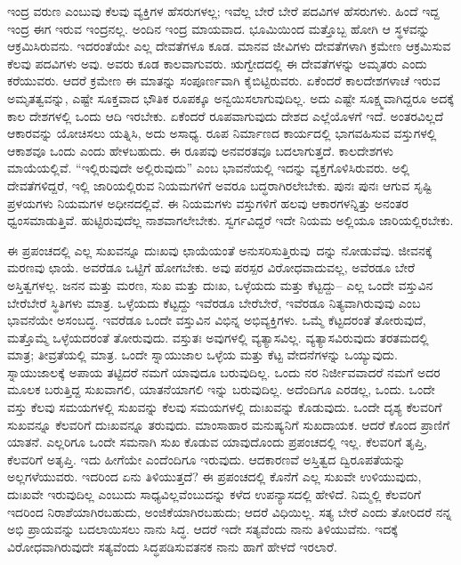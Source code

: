 ಇಂದ್ರ ವರುಣ ಎಂಬುವು ಕೆಲವು ವ್ಯಕ್ತಿಗಳ ಹೆಸರುಗಳಲ್ಲ; ಇವೆಲ್ಲ ಬೇರೆ ಬೇರೆ ಪದವಿಗಳ ಹೆಸರುಗಳು. ಹಿಂದೆ ಇದ್ದ ಇಂದ್ರ ಈಗ ಇರುವ ಇಂದ್ರನಲ್ಲ. ಅಂದಿನ ಇಂದ್ರ ಮಾಯವಾದ. ಭೂಮಿಯಿಂದ ಮತ್ತೊಬ್ಬ ಹೋಗಿ ಆ ಸ್ಥಳವನ್ನು ಆಕ್ರಮಿಸಿರುವನು. ಇದರಂತೆಯೇ ಎಲ್ಲ ದೇವತೆಗಳೂ ಕೂಡ. ಮಾನವ ಜೀವಿಗಳು ದೇವತೆಗಳಾಗಿ ಕ್ರಮೇಣ ಆಕ್ರಮಿಸುವ ಕೆಲವು ಪದವಿಗಳು ಅವು. ಅವರು ಕೂಡ ಕಾಲವಾಗುವರು. ಋಗ್ವೇದದಲ್ಲಿ ಈ ದೇವತೆಗಳನ್ನು ಅಮೃತರು ಎಂದು ಕರೆಯುವರು. ಆದರೆ ಕ್ರಮೇಣ ಈ ಮಾತನ್ನು ಸಂಪೂರ್ಣವಾಗಿ ಕೈಬಿಟ್ಟಿರುವರು. ಏಕೆಂದರೆ ಕಾಲದೇಶಗಳಾಚೆ ಇರುವ ಅಮೃತತ್ವವನ್ನು, ಎಷ್ಟೇ ಸೂಕ್ತವಾದ ಭೌತಿಕ ರೂಪಕ್ಕೂ ಅನ್ವಯಿಸಲಾಗುವುದಿಲ್ಲ. ಅದು ಎಷ್ಟೇ ಸೂಕ್ಷ್ಮವಾಗಿದ್ದರೂ ಅದಕ್ಕೆ ಕಾಲ ದೇಶಗಳಲ್ಲಿ ಒಂದು ಆದಿ ಇರಬೇಕು. ಏಕೆಂದರೆ ರೂಪವಾಗುವುದು ದೇಶದ ಎಲ್ಲೆಯೊಳಗೆ ಇದೆ. ಅಂತರವಿಲ್ಲದೆ ಆಕಾರವನ್ನು ಯೋಚಿಸಲು ಯತ್ನಿಸಿ, ಅದು ಅಸಾಧ್ಯ. ರೂಪ ನಿರ್ಮಾಣದ ಕಾರ್ಯದಲ್ಲಿ ಭಾಗವಹಿಸುವ ವಸ್ತುಗಳಲ್ಲಿ ಆಕಾಶವೂ ಒಂದು ಎಂದು ಹೇಳಬಹುದು. ಈ ರೂಪವು ಅನವರತವೂ ಬದಲಾಗುತ್ತದೆ. ಕಾಲದೇಶಗಳು ಮಾಯೆಯಲ್ಲಿವೆ. “ಇಲ್ಲಿರುವುದೇ ಅಲ್ಲಿರುವುದು” ಎಂಬ ಭಾವನೆಯಲ್ಲಿ ಇದನ್ನು ವ್ಯಕ್ತಗೊಳಿಸಿರುವರು. ಅಲ್ಲಿ ದೇವತೆಗಳಿದ್ದರೆ, ಇಲ್ಲಿ ಜಾರಿಯಲ್ಲಿರುವ ನಿಯಮಗಳಿಗೆ ಅವರೂ ಬದ್ಧರಾಗಿರಲೇಬೇಕು. ಪುನಃ ಪುನಃ ಆಗುವ ಸೃಷ್ಟಿ ಪ್ರಳಯಗಳು ನಿಯಮಗಳ ಅಧೀನದಲ್ಲಿವೆ. ಈ ನಿಯಮಗಳು ವಸ್ತುಗಳಿಗೆ ಹಲವು ಆಕಾರಗಳನ್ನಿತ್ತು ಅನಂತರ ಧ್ವಂಸಮಾಡುತ್ತಿವೆ. ಹುಟ್ಟಿರುವುದೆಲ್ಲ ನಾಶವಾಗಲೇಬೇಕು. ಸ್ವರ್ಗವಿದ್ದರೆ ಇದೇ ನಿಯಮ ಅಲ್ಲಿಯೂ ಜಾರಿಯಲ್ಲಿರಬೇಕು.


ಈ ಪ್ರಪಂಚದಲ್ಲಿ ಎಲ್ಲ ಸುಖವನ್ನೂ ದುಃಖವು ಛಾಯೆಯಂತೆ ಅನುಸರಿಸುತ್ತಿರುವು\break\ ದನ್ನು ನೋಡುವೆವು. ಜೀವನಕ್ಕೆ ಮರಣವು ಛಾಯೆ. ಅವರೆಡೂ ಒಟ್ಟಿಗೆ ಹೋಗಬೇಕು. ಅವು ಪರಸ್ಪರ ವಿರೋಧವಾದುವಲ್ಲ, ಅವೆರಡೂ ಬೇರೆ ಅಸ್ತಿತ್ವಗಳಲ್ಲ. ಜನನ ಮತ್ತು ಮರಣ, ಸುಖ ಮತ್ತು ದುಃಖ, ಒಳ್ಳೆಯದು ಮತ್ತು ಕೆಟ್ಟದ್ದು– ಎಲ್ಲ ಒಂದೇ ವಸ್ತುವಿನ ಬೇರೆಬೇರೆ ಸ್ಥಿತಿಗಳು ಮಾತ್ರ. ಒಳ್ಳೆಯದು ಕೆಟ್ಟದ್ದು ಇವೆರಡೂ ಬೇರೆಬೇರೆ, ಇವೆರಡೂ ನಿತ್ಯವಾಗಿರುವುವು ಎಂಬ ಭಾವನೆಯೇ ಅಸಂಬದ್ಧ. ಇವರೆಡೂ ಒಂದೇ ವಸ್ತುವಿನ ವಿಭಿನ್ನ ಅಭಿವ್ಯಕ್ತಿಗಳು. ಒಮ್ಮೆ ಕೆಟ್ಟದರಂತೆ ತೋರುವುದೆ, ಮತ್ತೊಮ್ಮೆ ಒಳ್ಳೆಯದರಂತೆ ತೋರುವುದು. ವಸ್ತುತಃ ಅವುಗಳಲ್ಲಿ ವ್ಯತ್ಯಾಸವಿಲ್ಲ. ವ್ಯತ್ಯಾಸವಿರುವುದು ತರತಮದಲ್ಲಿ ಮಾತ್ರ; ತೀವ್ರತೆಯಲ್ಲಿ ಮಾತ್ರ. ಒಂದೇ ಸ್ನಾಯುಜಾಲ ಒಳ್ಳೆಯ ಮತ್ತು ಕೆಟ್ಟ ವೇದನೆಗಳನ್ನು ಒಯ್ಯುವುದು. ಸ್ನಾಯುಜಾಲಕ್ಕೆ ಅಪಾಯ ತಟ್ಟಿದರೆ ನಮಗೆ ಯಾವುದೂ ಬರುವುದಿಲ್ಲ. ಒಂದು ನರ ನಿರ್ಜೀವವಾದರೆ ನಮಗೆ ಅದರ ಮೂಲಕ ಬರುತ್ತಿದ್ದ ಸುಖವಾಗಲಿ, ಯಾತನೆಯಾಗಲಿ ಇನ್ನು ಬರುವುದಿಲ್ಲ. ಅದೆಂದಿಗೂ ಎರಡಲ್ಲ, ಒಂದು. ಒಂದೇ ವಸ್ತು ಕೆಲವು ಸಮಯಗಳಲ್ಲಿ ಸುಖವನ್ನು ಕೆಲವು ಸಮಯಗಳಲ್ಲಿ ದುಃಖವನ್ನು ಕೊಡುವುದು. ಒಂದೇ ದೃಶ್ಯ ಕೆಲವರಿಗೆ ಸುಖವನ್ನೂ ಕೆಲವರಿಗೆ ದುಃಖವನ್ನೂ ತರುವುದು. ಮಾಂಸಾಹಾರ ಮನುಷ್ಯನಿಗೆ ಸುಖದಾಯಕ. ಆದರೆ ಕೊಂದ ಪ್ರಾಣಿಗೆ ಯಾತನೆ. ಎಲ್ಲರಿಗೂ ಒಂದೇ ಸಮನಾಗಿ ಸುಖ ಕೊಡುವ ಯಾವುದೊಂದು ಪ್ರಪಂಚದಲ್ಲಿ ಇಲ್ಲ. ಕೆಲವರಿಗೆ ತೃಪ್ತಿ, ಕೆಲವರಿಗೆ ಅತೃಪ್ತಿ. ಇದು ಹೀಗೆಯೇ ಎಂದೆಂದಿಗೂ ಇರುವುದು. ಆದಕಾರಣವೆ ಅಸ್ತಿತ್ವದ ದ್ವಿರೂಪತೆಯನ್ನು ಅಲ್ಲಗಳೆಯುವರು. ಇದರಿಂದ ಏನು ತಿಳಿಯುತ್ತದೆ? ಈ ಪ್ರಪಂಚದಲ್ಲಿ ಕೊನೆಗೆ ಎಲ್ಲ ಸುಖವೇ ಉಳಿಯುವುದು, ದುಃಖವೇ ಇರುವುದಿಲ್ಲ ಎಂಬುದು ಸಾಧ್ಯವಿಲ್ಲವೆಂಬುದನ್ನು ಕಳೆದ ಉಪನ್ಯಾಸದಲ್ಲಿ ಹೇಳಿದೆ. ನಿಮ್ಮಲ್ಲಿ ಕೆಲವರಿಗೆ ಇದರಿಂದ ನಿರಾಶೆಯಾಗಿರಬಹುದು, ಅಂಜಿಕೆಯಾಗಿರಬಹುದು; ಆದರೆ ವಿಧಿಯಿಲ್ಲ. ಸತ್ಯ ಬೇರೆ ಎಂದು ತೋರಿದರೆ ನನ್ನ ಅಭಿ ಪ್ರಾಯವನ್ನು ಬದಲಾಯಿಸಲು ನಾನು ಸಿದ್ಧ. ಆದರೆ ಇದೇ ಸತ್ಯವೆಂದು ನಾನು ತಿಳಿಯುವೆನು. ಇದಕ್ಕೆ ವಿರೋಧವಾಗಿರುವುದೇ ಸತ್ಯವೆಂದು ಸಿದ್ಧಪಡಿಸುವತನಕ ನಾನು ಹಾಗೆ ಹೇಳದೆ ಇರಲಾರೆ.

